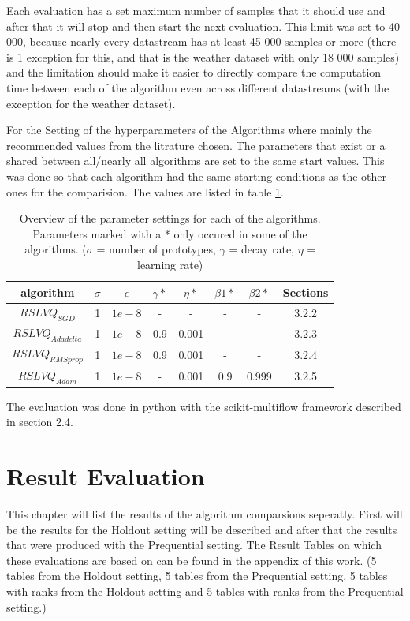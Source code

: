 \documentclass[12pt,oneside,a4paper,parskip]{scrbook}
\begin{document}
Each evaluation has a set maximum number of samples that it should use and after that it will stop and then start the next evaluation.
This limit was set to 40 000, because nearly every datastream has at least 45 000 samples or more (there is 1 exception for this,
and that is the weather dataset with only 18 000 samples) and the limitation should make it easier to directly compare the computation time 
between  each of the algorithm even across different datastreams (with the exception for the weather dataset).

For the Setting of the hyperparameters of the Algorithms where mainly the recommended values from the litrature chosen. 
The parameters that exist or a shared between all/nearly all algorithms are set to the same start values.
This was done so that each algorithm had the same starting conditions as the other ones for the comparision.
The values are listed in table \ref{tab:parameters}.

\begin{table}[H]
  \centering
  \begin{tabular} {|| c c c c c c c c||} 
    \hline
      algorithm & $\sigma$ & $\epsilon$ & $\gamma*$ & $\eta*$ & $\beta 1*$ & $\beta 2*$ & Sections\\
    \hline\hline
      $RSLVQ_\textit{SGD}$ & 1 & $1e-8$ & - & - & - & - & 3.2.2\\
    \hline 
      $RSLVQ_\textit{Adadelta}$ & 1 & $1e-8$ & 0.9 & 0.001 & - & - & 3.2.3\\
    \hline
      $RSLVQ_\textit{RMSprop}$ & 1 & $1e-8$ & 0.9 & 0.001 & - & - & 3.2.4\\
    \hline
      $RSLVQ_\textit{Adam}$ & 1 & $1e-8$ & - & 0.001 & 0.9 & 0.999 & 3.2.5\\
    \hline
  \end{tabular} 
  \caption{Overview of the parameter settings for each of the algorithms. Parameters marked with a * only occured in some of the algorithms.
  ($\sigma$ = number of prototypes, $\gamma$ = decay rate, $\eta$ = learning rate)}
  \label{tab:parameters}
\end{table}

The evaluation was done in python with the scikit-multiflow framework described in section 2.4.

\chapter{Result Evaluation}
This chapter will list the results of the algorithm comparsions seperatly.
First will be the results for the Holdout setting will be described and after that the results that were produced with the 
Prequential setting. The Result Tables on which these evaluations are based on can be found in the appendix of this work.
(5 tables from the Holdout setting, 5 tables from the Prequential setting, 5 tables with ranks from the Holdout setting
and 5 tables with ranks from the Prequential setting.) 
\end{document}
